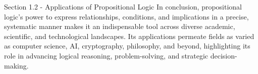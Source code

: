 \begin{notes}{Section 1.2 - Applications of Propositional Logic}
    In conclusion, propositional logic's power to express relationships, conditions, and implications in a precise, systematic manner makes it an indispensable tool across diverse academic, scientific, and technological landscapes. 
    Its applications permeate fields as varied as computer science, AI, cryptography, philosophy, and beyond, highlighting its role in advancing logical reasoning, problem-solving, and strategic decision-making.
\end{notes}